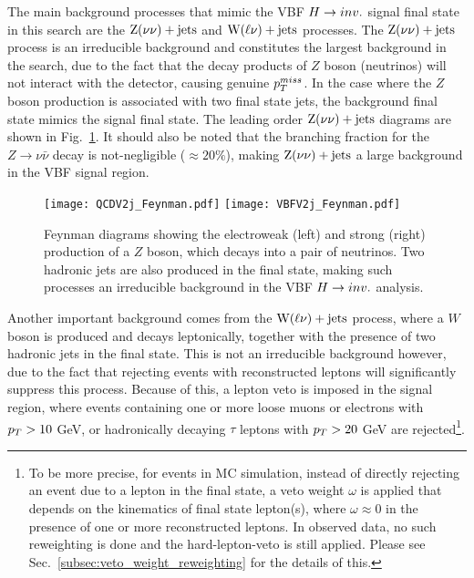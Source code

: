 The main background processes that mimic the VBF $H \rightarrow inv.$ signal final state in this search are the $\mathrm{Z}(\nu\nu)+\textrm{jets}$ and $\mathrm{W}(\ell\nu)+\textrm{jets}$ processes. 
The $\mathrm{Z}(\nu\nu)+\textrm{jets}$ process is an irreducible background and constitutes the largest background in the search, due to the fact that the decay
products of $Z$ boson (neutrinos) will not interact with the detector, causing genuine $p_T^{miss}$. In the case where the $Z$ boson production
is associated with two final state jets, the background final state mimics the signal final state. The leading order $\mathrm{Z}(\nu\nu)+\textrm{jets}$ diagrams
are shown in Fig.~\ref{fig:zvv_bkg_feynman}. It should also be noted that the branching fraction for the $Z \rightarrow \nu\bar{\nu}$ decay is
not-negligible ($\approx 20\%$), making $\mathrm{Z}(\nu\nu)+\textrm{jets}$ a large background in the VBF signal region. 

\begin{figure}[htbp!]
    \centering
    \texttt{[image: QCDV2j\_Feynman.pdf]}
    \texttt{[image: VBFV2j\_Feynman.pdf]}
    \caption{Feynman diagrams showing the electroweak (left) and strong (right) production of a $Z$ boson, which decays into
    a pair of neutrinos. Two hadronic jets are also produced in the final state, making such processes an irreducible background
    in the VBF $H \rightarrow inv.$ analysis.}
    \label{fig:zvv_bkg_feynman}
\end{figure}

Another important background comes from the $\mathrm{W}(\ell\nu)+\textrm{jets}$ process, where a $W$ boson is produced and decays leptonically,
together with the presence of two hadronic jets in the final state.
This is not an irreducible background however, due to the fact that rejecting events with reconstructed leptons
will significantly suppress this process. Because of this, a lepton veto is imposed in the signal region, where  
events containing one or more loose muons or electrons with $p_T >10$ GeV, or hadronically decaying $\tau$ 
leptons with $p_T>20$ GeV are rejected\footnote{To be more precise, for events in MC simulation, 
instead of directly rejecting an event due to
a lepton in the final state, a veto weight $\omega$ is applied that depends on the kinematics of final state lepton(s), where
$\omega \approx 0$ in the presence of one or more reconstructed leptons. In observed data, no such reweighting is done and
the hard-lepton-veto is still applied. Please see Sec.~\ref{subsec:veto_weight_reweighting}
for the details of this.}. 

